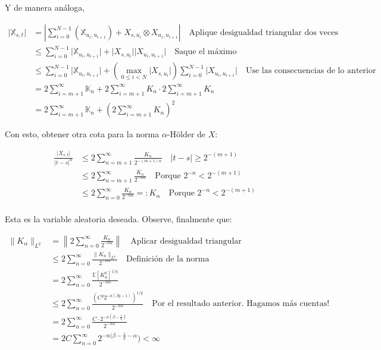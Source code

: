 Y de manera análoga,

\begin{align*}
	\lvert \mathbb{X}_{s,t} \rvert &= \left\lvert \sum_{i = 0}^{N - 1} (\mathbb{X}_{u_i, u_{i+1}}) + X_{s,u_i} \otimes X_{u_i, u_{i + 1}} \right\rvert \quad \text{Aplique desigualdad triangular dos veces} \\
	&\leq \sum_{i = 0}^{N - 1} \lvert \mathbb{X}_{u_i, u_{i+1}} \rvert + \lvert X_{s, u_i} \rvert \lvert X_{u_i, u_{i + 1}} \rvert \quad \text{Saque el máximo} \\
	&\leq \sum_{i = 0}^{N - 1} \lvert \mathbb{X}_{u_i, u_{i+1}} \rvert + \left( \max_{0 \leq i < N} \lvert X_{s, u_i} \rvert \right) \sum_{i = 0}^{N - 1} \lvert X_{u_i, u_{i + 1}} \rvert \quad \text{Use las consecuencias de lo anterior} \\
	&= 2 \sum_{i = m + 1}^{\infty} \mathbb{K}_n + 2 \sum_{i = m + 1}^{\infty} K_n \cdot 2 \sum_{i = m + 1}^{\infty} K_n \\
	&=  2 \sum_{i = m + 1}^{\infty} \mathbb{K}_n + \left( 2 \sum_{i = m + 1}^{\infty} K_n \right)^2
\end{align*}


Con esto, obtener otra cota para la norma $\alpha$-Hölder de $X$:

\begin{align*}
	\frac{ \lvert X_{s,t} \rvert }{ \lvert t - s \rvert^{\alpha} } &\leq 2 \sum_{n = m + 1}^{\infty} \frac{K_n}{2^{-(m+1) \alpha}} \quad \lvert t - s \rvert \geq 2^{-(m+1)} \\
	&\leq 2 \sum_{n = m + 1}^{\infty} \frac{K_n}{2^{-n \alpha}} \quad \text{Porque } 2^{-n} < 2^{-(m+1)} \\
	&\leq 2 \sum_{n = 0}^{\infty} \frac{K_n}{2^{-n \alpha}} =: K_{\alpha} \quad \text{Porque } 2^{-n} < 2^{-(m+1)} \\
\end{align*}

Esta es la variable aleatoria deseada. Observe, finalmente que:

\begin{align*}
	\lVert K_{\alpha} \rVert_{L^q} &= \left\lVert 2 \sum_{n=0}^{\infty} \frac{K_n}{2^{-n\alpha}} \right\rVert \quad \text{Aplicar desigualdad triangular} \\
	&\leq 2 \sum_{n=0}^{\infty} \frac{ \lVert K_n \rVert_{L^q} }{ 2^{-n\alpha} } \quad \text{Definición de la norma} \\
	&= 2 \sum_{n=0}^{\infty} \frac{ \mathbb{E}[K_n^q]^{1/q} }{ 2^{-n\alpha} }\\
	&\leq 2 \sum_{n=0}^{\infty} \frac{  \left(C^q 2^{-n(\beta q - 1)} \right)^{1/q}  }{ 2^{-n\alpha} } \quad \text{Por el resultado anterior. Hagamos más cuentas!} \\
	&= 2 \sum_{n=0}^{\infty} \frac{  C \cdot 2^{-n(\beta - \frac{1}{q})}  }{ 2^{-n\alpha} } \\
	&= 2C \sum_{n=0}^{\infty} 2^{-n(\beta - \frac{1}{q} - \alpha}) < \infty
\end{align*}

